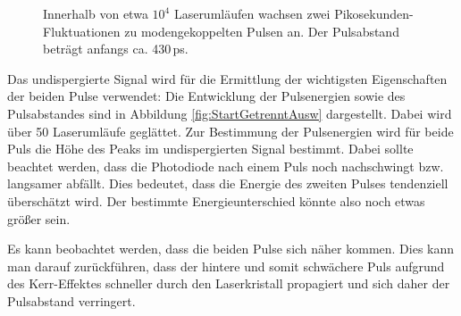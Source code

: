 \documentclass[bachelor,       %
               twoside,        %
               BCOR10mm,       %
               liststotoc,nomtotoc,bibtotoc, %
               english,ngerman, %
               final,          %
               ]{GAUBM}
\begin{document}
\begin{figure}[!htb]
   \centering
   \hfill
   \caption{Innerhalb von etwa $10^4$ Laserumläufen wachsen zwei Pikosekunden-Fluktuationen zu modengekoppelten Pulsen an.
   Der Pulsabstand beträgt anfangs ca. 430\,ps.}
   \label{fig:StartGetrennt}
\end{figure}
Das undispergierte Signal wird für die Ermittlung der wichtigsten Eigenschaften der beiden Pulse  verwendet: Die Entwicklung der Pulsenergien sowie des Pulsabstandes sind in Abbildung \ref{fig:StartGetrenntAusw} dargestellt.
Dabei wird über 50 Laserumläufe geglättet.
Zur Bestimmung der Pulsenergien wird für beide Puls die Höhe des Peaks im undispergierten Signal bestimmt.
Dabei sollte beachtet werden, dass die Photodiode nach einem Puls noch nachschwingt bzw. langsamer abfällt.
Dies bedeutet, dass die Energie des zweiten Pulses tendenziell überschätzt wird.
Der bestimmte Energieunterschied könnte also noch etwas größer sein.

Es kann beobachtet werden, dass die beiden Pulse sich näher kommen.
Dies kann man darauf zurückführen, dass der hintere und somit schwächere Puls aufgrund des Kerr-Effektes schneller durch den Laserkristall propagiert und sich daher der Pulsabstand verringert.
\end{document}
